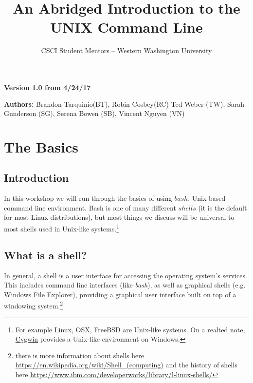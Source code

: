 \documentclass[oneside]{book}
\begin{document}
\title{An Abridged Introduction to the UNIX Command Line}
\author{CSCI Student Mentors \--- Western Washington University}
\date{}

\maketitle
\tableofcontents
\newpage


\begin{versionhistory}
    \begin{center}
        \large{\textbf{Version 1.0 from 4/24/17}}
    \end{center}
    \large{\textbf{Authors:} Brandon Tarquinio(BT), Robin Cosbey(RC)  Ted Weber (TW), Sarah Gunderson (SG), Serena Bowen (SB), Vincent Nguyen (VN)}
\end{versionhistory}
\chapter{The Basics}

\section{Introduction}
In this workshop we will run through the basics of using $bash$, Unix-based command line environment. Bash is one of many different  $shells$ (it is the default for most Linux distributions), but most things we discuss will be universal to most shells used in Unix-like systems.\footnote{For example Linux, OSX, FreeBSD are Unix-like systems. On a realted note, \href{https://www.cygwin.com/}{Cygwin} provides a Unix-like environment on Windows.} 

\section{What is a shell?}
In general, a shell is a user interface for accessing the operating system's services. This includes command line interfaces (like \textit{bash}), as well as graphical shells (e.g. Windows File Explorer), providing a graphical user interface built on top of a windowing system.\footnote{there is more information about shells here \url{https://en.wikipedia.org/wiki/Shell_(computing)} and the history of shells here \url{https://www.ibm.com/developerworks/library/l-linux-shells/}} 
\end{document}
